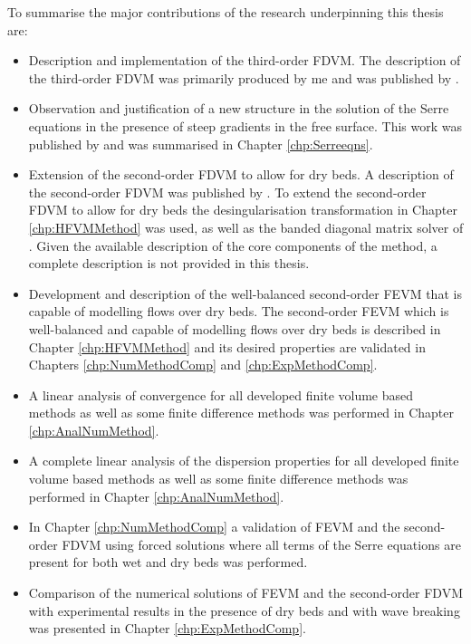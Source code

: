 To summarise the major contributions of the research underpinning this thesis are:
\begin{itemize}
	\item Description and implementation of the third-order FDVM. The description of the third-order FDVM was primarily produced by me and was published by \citet{Zoppou-etal-2017}.
	\item Observation and justification of a new structure in the solution of the Serre equations in the presence of steep gradients in the free surface. This work was published by \citet{Pitt-2018-61} and was summarised in Chapter \ref{chp:Serreeqns}.
	\item Extension of the second-order FDVM to allow for dry beds. A description of the second-order FDVM was published by \citet{Zoppou-etal-2017}. To extend the second-order FDVM to allow for dry beds the desingularisation transformation in Chapter \ref{chp:HFVMMethod} was used, as well as the banded diagonal matrix solver of \citet{NumRecC-1996}. Given the available description of the core components of the method, a complete description is not provided in this thesis.
	\item Development and description of the well-balanced second-order FEVM that is capable of modelling flows over dry beds. The second-order FEVM which is well-balanced and capable of modelling flows over dry beds is described in Chapter \ref{chp:HFVMMethod} and its desired properties are validated in Chapters \ref{chp:NumMethodComp} and \ref{chp:ExpMethodComp}.
	\item A linear analysis of convergence for all developed finite volume based methods as well as some finite difference methods was performed in Chapter \ref{chp:AnalNumMethod}.
	\item A complete linear analysis of the dispersion properties for all developed finite volume based methods as well as some finite difference methods was performed in Chapter \ref{chp:AnalNumMethod}.
	\item  In Chapter \ref{chp:NumMethodComp} a validation of FEVM and the second-order FDVM using forced solutions where all terms of the Serre equations are present for both wet and dry beds was performed.
	\item Comparison of the numerical solutions of FEVM and the second-order FDVM with experimental results in the presence of dry beds and with wave breaking was presented in Chapter \ref{chp:ExpMethodComp}. 
\end{itemize}

